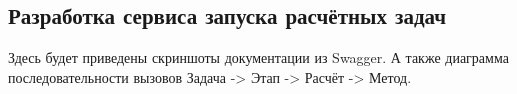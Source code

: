 \subsection{\large{Разработка сервиса запуска расчётных задач}}

Здесь будет приведены скриншоты документации из Swagger.
А также диаграмма последовательности вызовов Задача -> Этап -> Расчёт -> Метод.